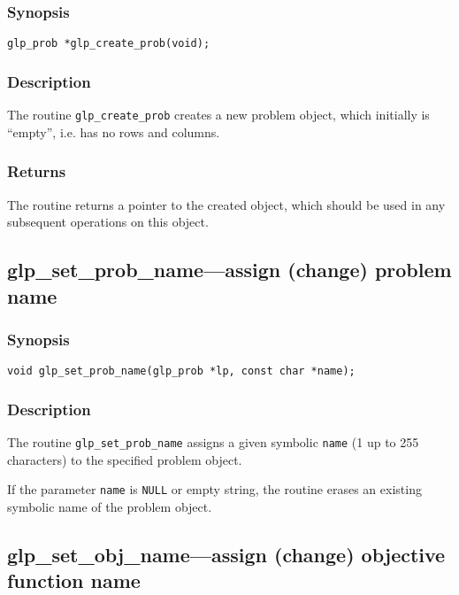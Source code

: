\subsubsection*{Synopsis}

\begin{verbatim}
glp_prob *glp_create_prob(void);
\end{verbatim}

\subsubsection*{Description}

The routine \verb|glp_create_prob| creates a new problem object, which
initially is ``empty'', i.e. has no rows and columns.

\subsubsection*{Returns}

The routine returns a pointer to the created object, which should be
used in any subsequent operations on this object.

\subsection{glp\_set\_prob\_name---assign (change) problem name}

\subsubsection*{Synopsis}

\begin{verbatim}
void glp_set_prob_name(glp_prob *lp, const char *name);
\end{verbatim}

\subsubsection*{Description}

The routine \verb|glp_set_prob_name| assigns a given symbolic
\verb|name| (1 up to 255 characters) to the specified problem object.

If the parameter \verb|name| is \verb|NULL| or empty string, the routine
erases an existing symbolic name of the problem object.

\subsection{glp\_set\_obj\_name---assign (change) objective function
name}


